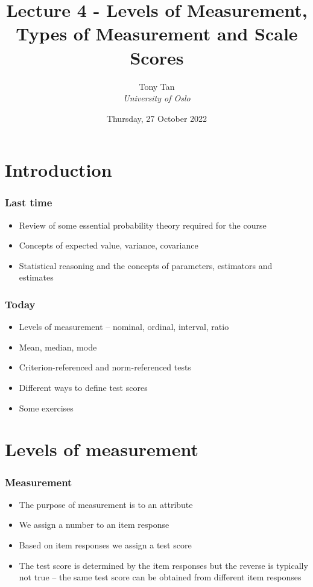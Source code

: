 \documentclass[compress]{beamer}\usepackage[]{graphicx}\usepackage[]{xcolor}
\title{Lecture 4 - Levels of Measurement, Types of Measurement and Scale Scores}
\author[]{Tony Tan \\\vspace{6pt} {\em{University of Oslo}} }
\date{Thursday, 27 October 2022}
\begin{document}
\begin{frame}[fragile]
\titlepage
\end{frame}


\section{Introduction}

\begin{frame}[fragile]
  \frametitle{Last time}
    \begin{itemize}
      \item Review of some essential probability theory required for the course
      \item Concepts of expected value, variance, covariance
      \item Statistical reasoning and the concepts of parameters, estimators and estimates
    \end{itemize}
\end{frame}


\begin{frame}[fragile]
  \frametitle{Today}
    \begin{itemize}
      \item Levels of measurement -- nominal, ordinal, interval, ratio
      \item Mean, median, mode
      \item Criterion-referenced and norm-referenced tests
      \item Different ways to define test scores
      \item Some exercises
    \end{itemize}
\end{frame}


\section{Levels of measurement}

\begin{frame}[fragile]
  \frametitle{Measurement}
    \begin{itemize}
      \item The purpose of measurement is to  an attribute
      \item We assign a number to an item response
      \item Based on item responses we assign a test score
      \item The test score is determined by the item responses but the reverse is typically not true -- the same test score can be obtained from different item responses
    \end{itemize}
\end{frame}
\end{document}
